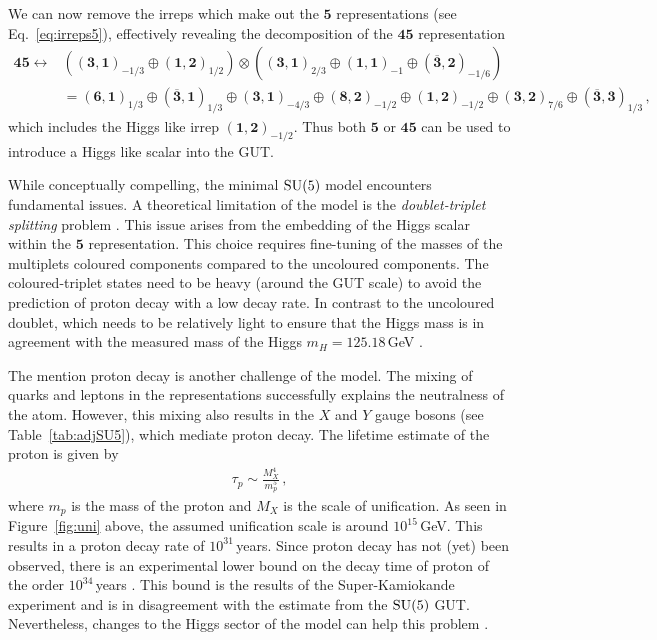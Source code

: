 We can now remove the irreps which make out the $\mathbf{5}$ representations (see Eq.~\eqref{eq:irreps5}), effectively revealing the decomposition of the $\mathbf{45}$ representation
\begin{align}
    \mathbf{45} \leftrightarrow & \left( (\mathbf{3},\mathbf{1})_{-1/3} \oplus (\mathbf{1},\mathbf{2})_{1/2} \right) \otimes \left( (\mathbf{3},\mathbf{1})_{2/3} \oplus (\mathbf{1},\mathbf{1})_{-1} \oplus (\overline{\mathbf{3}},\mathbf{2})_{-1/6} \right) \nonumber\\
    &= (\mathbf{6},\mathbf{1})_{1/3} \oplus (\overline{\mathbf{3}},\mathbf{1})_{1/3} \oplus (\mathbf{3},\mathbf{1})_{-4/3} \oplus (\mathbf{8},\mathbf{2})_{-1/2} \oplus (\mathbf{1},\mathbf{2})_{-1/2} \oplus (\mathbf{3},\mathbf{2})_{7/6} \oplus (\overline{\mathbf{3}},\mathbf{3})_{1/3}\,,
\end{align}
which includes the Higgs like irrep $(\mathbf{1},\mathbf{2})_{-1/2} $. Thus both ${\mathbf{5}}$ or ${\mathbf{45}}$ can be used to introduce a Higgs like scalar into the GUT.  

While conceptually compelling, the minimal $\mathrm{SU}(5)$ model encounters fundamental issues. A theoretical limitation of the model is the \textit{doublet-triplet splitting} problem \cite{Croon:2019kpe}. This issue arises from the embedding of the Higgs scalar within the $\mathbf{5}$ representation. This choice requires fine-tuning of the masses of the multiplets coloured components compared to the uncoloured components. The coloured-triplet states need to be heavy (around the GUT scale) to avoid the prediction of proton decay with a low decay rate. In contrast to the uncoloured doublet, which needs to be relatively light to ensure that the Higgs mass is in agreement with the measured mass of the Higgs $m_H=125.18\,$GeV \cite{Croon:2019kpe}. 

The mention proton decay is another challenge of the model. The mixing of quarks and leptons in the representations successfully explains the neutralness of the atom. However, this mixing also results in the $X$ and $Y$ gauge bosons (see Table~\ref{tab:adjSU5}), which mediate proton decay. The lifetime estimate of the proton is given by \cite{Croon:2019kpe}
\begin{align}
    \tau_p\sim\frac{M_X^4}{m_p^5}\,,
\end{align}
where $m_p$ is the mass of the proton and $M_X$ is the scale of unification. As seen in Figure~\ref{fig:uni} above, the assumed unification scale is around $10^{15}\,$GeV. This results in a proton decay rate of $10^{31}\,$years. Since proton decay has not (yet) been observed, there is an experimental lower bound on the decay time of proton of the order $10^{34}\,$years \cite{Takenaka:2020cmb}. This bound is the results of the Super-Kamiokande experiment and is in disagreement with the estimate from the $\mathrm{SU}(5)$ GUT. Nevertheless, changes to the Higgs sector of the model can help this problem \cite{Dorsner:2005fq,Dorsner:2006dj,Fornal:2017xcj,FileviezPerez:2018dyf}. 

